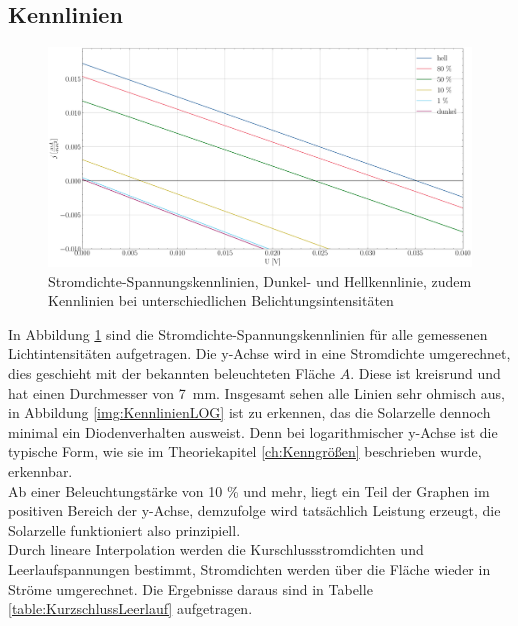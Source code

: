 \documentclass[12pt,a4paper,ngerman]{report}
\begin{document}
\subsection{Kennlinien}\label{ch:Kennlinien}
\begin{figure}
	\centering
	\includegraphics[width=\textwidth]{Bilder/Kennlinien.pdf}
	\caption[Stromdichte-Spannungskennlinien]{Stromdichte-Spannungskennlinien, Dunkel- und Hellkennlinie, zudem Kennlinien bei unterschiedlichen Belichtungsintensitäten}
	\label{img:Kennlinien}
\end{figure}
In Abbildung \ref{img:Kennlinien} sind die Stromdichte-Spannungskennlinien für alle gemessenen Lichtintensitäten aufgetragen. Die y-Achse wird in eine Stromdichte umgerechnet, dies geschieht mit der bekannten beleuchteten Fläche $A$. Diese ist kreisrund und hat einen Durchmesser von \SI{7}{\milli \meter}. Insgesamt sehen alle Linien sehr ohmisch aus, in Abbildung \ref{img:KennlinienLOG} ist zu erkennen, das die Solarzelle dennoch minimal ein Diodenverhalten ausweist. Denn bei logarithmischer y-Achse ist die typische Form, wie sie im Theoriekapitel \ref{ch:Kenngrößen} beschrieben wurde, erkennbar.\\
Ab einer Beleuchtungstärke von 10 \% und mehr, liegt ein Teil der Graphen im positiven Bereich der y-Achse, demzufolge wird tatsächlich Leistung erzeugt, die Solarzelle funktioniert also prinzipiell.\\
Durch lineare Interpolation werden die Kurschlussstromdichten und Leerlaufspannungen bestimmt, Stromdichten werden über die Fläche wieder in Ströme umgerechnet. Die Ergebnisse daraus sind in Tabelle \ref{table:KurzschlussLeerlauf} aufgetragen. 
\end{document}
